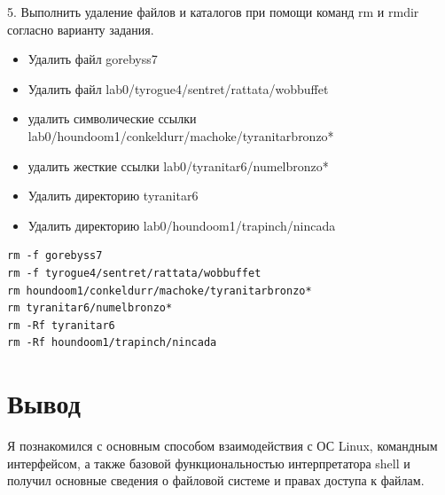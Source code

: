 \documentclass{article}
\begin{document}
\newpage

5. Выполнить удаление файлов и каталогов при помощи команд rm и rmdir согласно варианту задания.

\begin{itemize}
  \item Удалить файл gorebyss7
  \item Удалить файл lab0/tyrogue4/sentret/rattata/wobbuffet
  \item удалить символические ссылки lab0/houndoom1/conkeldurr/machoke/tyranitarbronzo*
  \item удалить жесткие ссылки lab0/tyranitar6/numelbronzo*
  \item Удалить директорию tyranitar6
  \item Удалить директорию lab0/houndoom1/trapinch/nincada
\end{itemize}

\begin{lstlisting}
rm -f gorebyss7
rm -f tyrogue4/sentret/rattata/wobbuffet
rm houndoom1/conkeldurr/machoke/tyranitarbronzo*
rm tyranitar6/numelbronzo*
rm -Rf tyranitar6
rm -Rf houndoom1/trapinch/nincada
\end{lstlisting}

\vspace*{\fill}


\section*{Вывод}
Я познакомился с основным способом взаимодействия с ОС Linux,
командным интерфейсом, а также базовой функциональностью
интерпретатора shell и получил основные сведения о файловой
системе и правах доступа к файлам.
\end{document}
